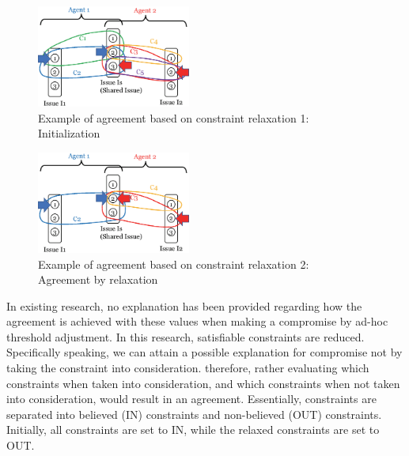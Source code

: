 \documentclass[paper]{ieice}
\begin{document}
\begin{figure}[h]
    \centering
    \includegraphics[width=0.45\textwidth]{img/example1.eps}
    \caption{Example of agreement based on constraint relaxation 1: \\Initialization}
    \label{fig:Example1}
\end{figure}
\begin{figure}[h]
    \centering
    \includegraphics[width=0.45\textwidth]{img/example2.eps}
    \caption{Example of agreement based on constraint relaxation 2: \\Agreement by relaxation}
    \label{fig:Example2}
\end{figure}



 In existing research, no explanation has been provided regarding how the agreement is achieved with these values when making a compromise by ad-hoc threshold adjustment. In this research, satisfiable constraints are reduced. Specifically speaking, we can attain a possible explanation for compromise not by taking the constraint into consideration. therefore, rather evaluating which constraints when taken into consideration, and which constraints when not taken into consideration, would result in an agreement. Essentially, constraints are separated into believed (IN) constraints and non-believed (OUT) constraints. Initially, all constraints are set to IN, while the relaxed constraints are set to OUT.
 
 
\end{document}
